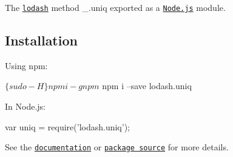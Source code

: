 The \href{https://lodash.com/}{\tt lodash} method {\ttfamily \+\_\+.\+uniq} exported as a \href{https://nodejs.org/}{\tt Node.\+js} module.

\subsection*{Installation}

Using npm\+: 
\begin{DoxyCode}
$ \{sudo -H\} npm i -g npm
$ npm i --save lodash.uniq
\end{DoxyCode}


In Node.\+js\+: 
\begin{DoxyCode}
var uniq = require('lodash.uniq');
\end{DoxyCode}


See the \href{https://lodash.com/docs#uniq}{\tt documentation} or \href{https://github.com/lodash/lodash/blob/4.5.0-npm-packages/lodash.uniq}{\tt package source} for more details. 